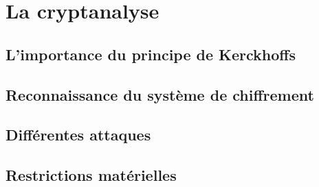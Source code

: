 \chapter{La cryptanalyse}
\section{L'importance du principe de Kerckhoffs}
\section{Reconnaissance du système de chiffrement}
\section{Différentes attaques}
\section{Restrictions matérielles}

